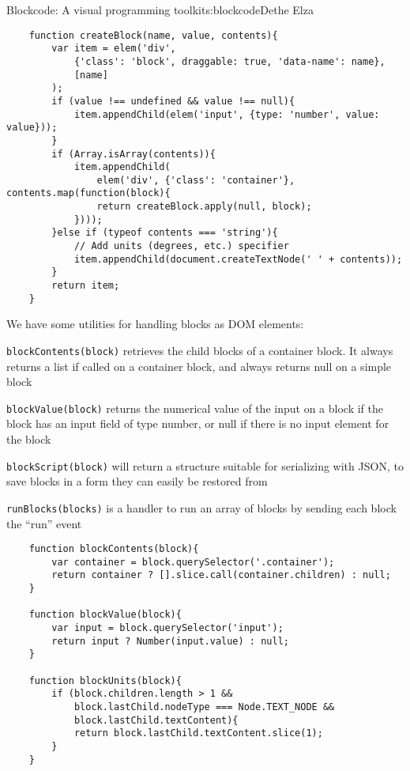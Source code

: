 \begin{aosachapter}{Blockcode: A visual programming toolkit}{s:blockcode}{Dethe Elza}
\begin{verbatim}
    function createBlock(name, value, contents){
        var item = elem('div',
            {'class': 'block', draggable: true, 'data-name': name},
            [name]
        );
        if (value !== undefined && value !== null){
            item.appendChild(elem('input', {type: 'number', value: value}));
        }
        if (Array.isArray(contents)){
            item.appendChild(
                elem('div', {'class': 'container'}, contents.map(function(block){
                return createBlock.apply(null, block);
            })));
        }else if (typeof contents === 'string'){
            // Add units (degrees, etc.) specifier
            item.appendChild(document.createTextNode(' ' + contents));
        }
        return item;
    }
\end{verbatim}

We have some utilities for handling blocks as DOM elements:

\begin{aosaitemize}

\item
  \texttt{blockContents(block)} retrieves the child blocks of a
  container block. It always returns a list if called on a container
  block, and always returns null on a simple block
\item
  \texttt{blockValue(block)} returns the numerical value of the input on
  a block if the block has an input field of type number, or null if
  there is no input element for the block
\item
  \texttt{blockScript(block)} will return a structure suitable for
  serializing with JSON, to save blocks in a form they can easily be
  restored from
\item
  \texttt{runBlocks(blocks)} is a handler to run an array of blocks by
  sending each block the ``run'' event
\end{aosaitemize}

\begin{verbatim}
    function blockContents(block){
        var container = block.querySelector('.container');
        return container ? [].slice.call(container.children) : null;
    }

    function blockValue(block){
        var input = block.querySelector('input');
        return input ? Number(input.value) : null;
    }

    function blockUnits(block){
        if (block.children.length > 1 &&
            block.lastChild.nodeType === Node.TEXT_NODE &&
            block.lastChild.textContent){
            return block.lastChild.textContent.slice(1);
        }
    }


\end{verbatim}
\end{aosachapter}
